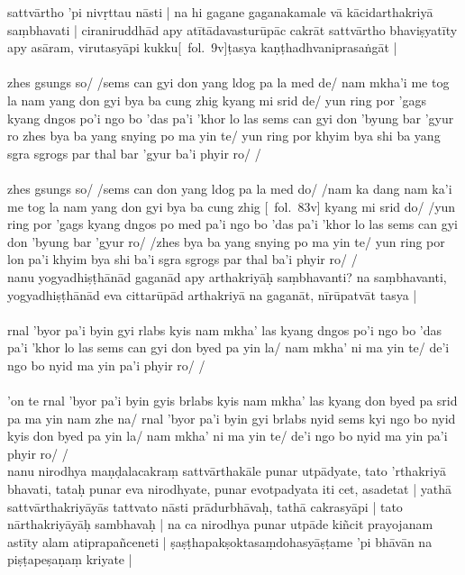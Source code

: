 \documentclass[12pt]{article}
\begin{document}
sattvārtho 'pi nivṛttau nāsti | na hi gagane gaganakamale vā kācidarthakriyā saṃbhavati | ciraniruddhād apy atītādavasturūpāc cakrāt sattvārtho bhaviṣyatīty apy asāram, virutasyāpi kukku[\MS\ fol.\ 9v]ṭasya kaṇṭhadhvaniprasaṅgāt |\\

\textbf{\TVA}\\
zhes gsungs so/ /sems can gyi don yang ldog pa la med de/ nam mkha'i me tog la nam yang don gyi bya ba cung zhig kyang mi srid de/ yun ring por 'gags kyang dngos po'i ngo bo 'das pa'i 'khor lo las sems can gyi don 'byung bar 'gyur ro zhes bya ba yang snying po ma yin te/ yun ring por khyim bya shi ba yang sgra sgrogs par thal bar 'gyur ba'i phyir ro/ /\\

\textbf{\TVB}\\
zhes gsungs so/ /sems can don yang ldog pa la med do/ /nam ka dang nam ka'i me tog la nam yang don gyi bya ba cung zhig [\TVB\ fol.\ 83v] kyang mi srid do/ /yun ring por 'gags kyang dngos po med pa'i ngo bo 'das pa'i 'khor lo las sems can gyi don 'byung bar 'gyur ro/ /zhes bya ba yang snying po ma yin te/ yun ring por lon pa'i khyim bya shi ba'i sgra sgrogs par thal ba'i phyir ro/ /\\

nanu yogyadhiṣṭhānād gaganād apy arthakriyāḥ saṃbhavanti? na saṃbhavanti, yogyadhiṣṭhānād eva cittarūpād arthakriyā na gaganāt, nīrūpatvāt tasya |\\

\textbf{\TVA}\\
rnal 'byor pa'i byin gyi rlabs kyis nam mkha' las kyang dngos po'i ngo bo 'das pa'i 'khor lo las sems can gyi don byed pa yin la/ nam mkha' ni ma yin te/ de'i ngo bo nyid ma yin pa'i phyir ro/ /\\

\textbf{\TVB}\\
'on te rnal 'byor pa'i byin gyis brlabs kyis nam mkha' las kyang don byed pa srid pa ma yin nam zhe na/ rnal 'byor pa'i byin gyi brlabs nyid sems kyi ngo bo nyid kyis don byed pa yin la/ nam mkha' ni ma yin te/ de'i ngo bo nyid ma yin pa'i phyir ro/ /\\

nanu nirodhya maṇḍalacakraṃ sattvārthakāle punar utpādyate, tato 'rthakriyā bhavati, tataḥ punar eva nirodhyate, punar evotpadyata iti cet, asadetat | yathā sattvārthakriyāyās tattvato nāsti prādurbhāvaḥ, tathā cakrasyāpi | tato nārthakriyāyāḥ sambhavaḥ | na ca nirodhya punar utpāde kiñcit prayojanam astīty alam atiprapañceneti | ṣaṣṭhapakṣoktasaṃdohasyāṣṭame 'pi bhāvān na piṣṭapeṣaṇaṃ kriyate |\\
\end{document}

